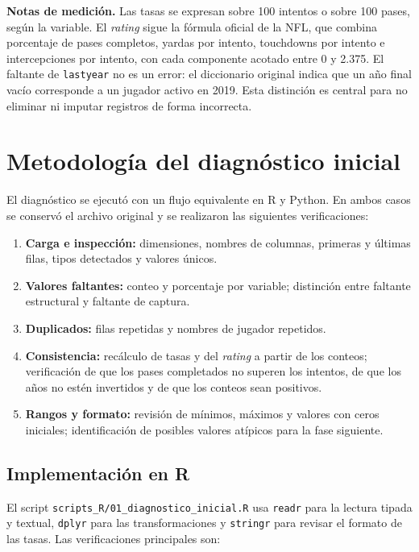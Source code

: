 \documentclass[11pt,a4paper]{article}
\begin{document}
\textbf{Notas de medición.} Las tasas se expresan sobre 100 intentos o sobre 100 pases, según la variable. El \textit{rating} sigue la fórmula oficial de la NFL, que combina porcentaje de pases completos, yardas por intento, touchdowns por intento e intercepciones por intento, con cada componente acotado entre 0 y 2.375. El faltante de \texttt{lastyear} no es un error: el diccionario original indica que un año final vacío corresponde a un jugador activo en 2019. Esta distinción es central para no eliminar ni imputar registros de forma incorrecta.

\section{Metodología del diagnóstico inicial}
El diagnóstico se ejecutó con un flujo equivalente en R y Python. En ambos casos se conservó el archivo original y se realizaron las siguientes verificaciones:

\begin{enumerate}
  \item \textbf{Carga e inspección:} dimensiones, nombres de columnas, primeras y últimas filas, tipos detectados y valores únicos.
  \item \textbf{Valores faltantes:} conteo y porcentaje por variable; distinción entre faltante estructural y faltante de captura.
  \item \textbf{Duplicados:} filas repetidas y nombres de jugador repetidos.
  \item \textbf{Consistencia:} recálculo de tasas y del \textit{rating} a partir de los conteos; verificación de que los pases completados no superen los intentos, de que los años no estén invertidos y de que los conteos sean positivos.
  \item \textbf{Rangos y formato:} revisión de mínimos, máximos y valores con ceros iniciales; identificación de posibles valores atípicos para la fase siguiente.
\end{enumerate}

\subsection*{Implementación en R}
El script \texttt{scripts\_R/01\_diagnostico\_inicial.R} usa \texttt{readr} para la lectura tipada y textual, \texttt{dplyr} para las transformaciones y \texttt{stringr} para revisar el formato de las tasas. Las verificaciones principales son:
\end{document}
